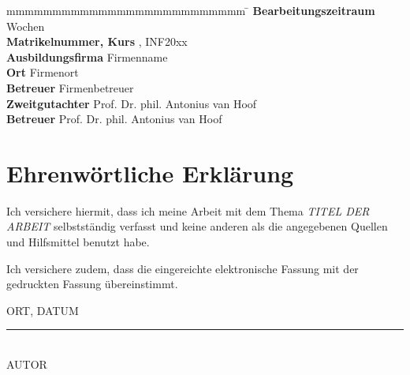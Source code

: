 \documentclass[
	pdftex,
	oneside,  
	12pt,			   	 %
	parskip=half,		 %
	headheight = 12pt,    	%
	headsepline,		    	%
	footheight = 16pt,	    	%
	footsepline,		   	 %
	abstract=true,		%
	DIV=calc,		    	%
	BCOR=8mm,		    	%
	headinclude=false,   	%
	footinclude=false,	    	%
	listof=totoc,		    	%
	toc=bibliography,	    	%
]{scrreprt}	                    		 %
\begin{document}
\begin{spacing}{1}
\begin{titlepage}
\begin{center}
{	}
	\end{center}
	\vfill
	\begin{spacing}{1.2}
	\begin{tabbing}
		mmmmmmmmmmmmmmmmmmmmmmmmmm             \= \kill
		\textbf{Bearbeitungszeitraum}        Wochen\\
		\textbf{Matrikelnummer, Kurs} 	  , INF20xx\\

		\textbf{Ausbildungsfirma}               \>  Firmenname\\
		\textbf{Ort}				\> Firmenort\\
		\textbf{Betreuer}              	 \>  Firmenbetreuer\\
		\textbf{Zweitgutachter}		\>  Prof. Dr. phil. Antonius van Hoof\\

		\textbf{Betreuer}              \>   Prof. Dr. phil. Antonius van Hoof\\
	\end{tabbing}
	\end{spacing}
\end{titlepage}
\end{spacing}

\newpage



\thispagestyle{empty}

\section*{Ehrenwörtliche Erklärung}
\vspace*{2em}
Ich versichere hiermit, dass ich meine Arbeit mit dem Thema \emph{TITEL DER ARBEIT} selbstständig verfasst und keine anderen
als die angegebenen Quellen und Hilfsmittel benutzt habe.

Ich versichere zudem, dass die eingereichte elektronische Fassung mit der gedruckten Fassung
übereinstimmt.

\vspace{3em}

ORT, DATUM

\vspace{4em}

\rule{6cm}{0.4pt}\\
AUTOR
\end{document}
